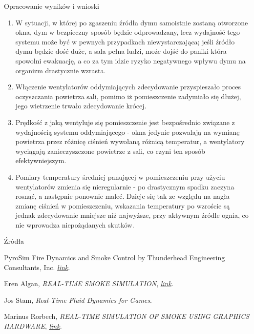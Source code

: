 \documentclass[a4paper, 12pt]{scrartcl}
\begin{document}
\begin{section}{Opracowanie wyników i wnioski}
\begin{enumerate}
			\item W sytuacji, w której po zgaszeniu źródła dymu samoistnie zostaną otworzone okna, dym w bezpieczny sposób będzie odprowadzany, lecz wydajność tego systemu może być w pewnych przypadkach niewystarczająca; jeśli źródło dymu będzie dość duże, a sala pełna ludzi, może dojść do paniki która spowolni ewakuację, a co za tym idzie ryzyko negatywnego wpływu dymu na organizm drastycznie wzrasta.
			\item Włączenie wentylatorów oddymiających zdecydowanie przyspieszało proces oczyszczania powietrza sali, pomimo iż pomieszczenie zadymiało się dłużej, jego wietrzenie trwało zdecydowanie krócej.
			\item Prędkość z jaką wentyluje się pomieszczenie jest bezpośrednio związane z wydajnością systemu oddymiającego - okna jedynie pozwalają na wymianę powietrza przez różnicę ciśnień wywołaną różnicą temperatur, a wentylatory wyciągają zanieczyszczone powietrze z sali, co czyni ten sposób efektywniejszym.
			\item Pomiary temperatury średniej panującej w pomieszczeniu przy użyciu wentylatorów zmienia się nieregularnie - po drastycznym spadku zaczyna rosnąć, a następnie ponownie maleć. Dzieje się tak ze względu na nagła zmianę ciśnień w pomieszczeniu, wskazania temperatury po wzroście są jednak zdecydowanie mniejsze niż najwyższe, przy aktywnym źródle ognia, co nie wprowadza niepożądanych skutków.
			
		\end{enumerate}
		
	\end{section}

	\begin{section}{Źródła}
		
		PyroSim Fire Dynamics and Smoke Control by Thunderhead Engineering Consultants, Inc. \textit{\href{https://www.thunderheadeng.com/pyrosim/}{link}}.
		\begin{thebibliography}{15}
				Eren Algan, \textit{REAL-TIME SMOKE SIMULATION},
				\textit{\href{http://repository.bilkent.edu.tr/bitstream/handle/11693/15609/0006332.pdf?sequence=1&isAllowed=y}{link}}.
				
				Jos Stam, \textit{Real-Time Fluid Dynamics for Games}.
				
				Marinus Rorbech, \textit{REAL-TIME SIMULATION OF SMOKE USING GRAPHICS HARDWARE},
				\textit{\href{http://image.diku.dk/projects/media/roerbech.04.pdf}{link}}.
		\end{thebibliography}
	\end{section}
	
	
\end{document}
